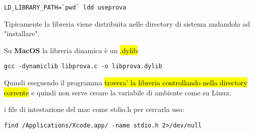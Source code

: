 \begin{lstlisting}
LD_LIBRARY_PATH=`pwd` ldd useprova
\end{lstlisting}

Tipicamente la libreria viene distribuita nelle directory di sistema andandola ad "installare".


Su \textbf{MacOS} la libreria dinamica è un \hl{.dylib}:

\begin{lstlisting}
gcc -dynamiclib libprova.c -o libprova.dylib
\end{lstlisting}

Quindi eseguendo il programma \hl{trovera' la libreria controllando nella directory corrente} e quindi non serve creare la variabile di ambiente come su Linux.

i file di intestazione del mac come stdio.h per cercarla uso:

\begin{lstlisting}
find /Applications/Xcode.app/ -name stdio.h 2>/dev/null
\end{lstlisting}


